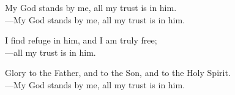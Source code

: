 \responsory

\noindent My God stands by me, all my trust is in him.\\
{\color{red}---\thinspace}My God stands by me, all my trust is in him.

\medskip\noindent I find refuge in him, and I am truly free;\\
{\color{red}---\thinspace}all my trust is in him.

\medskip\noindent Glory to the Father, and to the Son, and to the Holy Spirit.\\
{\color{red}---\thinspace}My God stands by me, all my trust is in him.